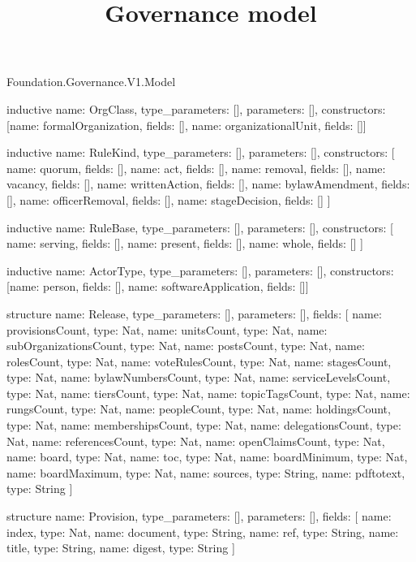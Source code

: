 \begin{lexlean}{Foundation.Governance.V1.Model}
\title{Governance model}
\begin{semanticmodule}
inductive{
  name: OrgClass,
  type_parameters: [],
  parameters: [],
  constructors: [{name: formalOrganization, fields: []}, {name: organizationalUnit, fields: []}]
}

inductive{
  name: RuleKind,
  type_parameters: [],
  parameters: [],
  constructors: [
    {name: quorum, fields: []},
    {name: act, fields: []},
    {name: removal, fields: []},
    {name: vacancy, fields: []},
    {name: writtenAction, fields: []},
    {name: bylawAmendment, fields: []},
    {name: officerRemoval, fields: []},
    {name: stageDecision, fields: []}
  ]
}

inductive{
  name: RuleBase,
  type_parameters: [],
  parameters: [],
  constructors: [
    {name: serving, fields: []},
    {name: present, fields: []},
    {name: whole, fields: []}
  ]
}

inductive{
  name: ActorType,
  type_parameters: [],
  parameters: [],
  constructors: [{name: person, fields: []}, {name: softwareApplication, fields: []}]
}

structure{
  name: Release,
  type_parameters: [],
  parameters: [],
  fields: [
    {name: provisionsCount, type: Nat},
    {name: unitsCount, type: Nat},
    {name: subOrganizationsCount, type: Nat},
    {name: postsCount, type: Nat},
    {name: rolesCount, type: Nat},
    {name: voteRulesCount, type: Nat},
    {name: stagesCount, type: Nat},
    {name: bylawNumbersCount, type: Nat},
    {name: serviceLevelsCount, type: Nat},
    {name: tiersCount, type: Nat},
    {name: topicTagsCount, type: Nat},
    {name: rungsCount, type: Nat},
    {name: peopleCount, type: Nat},
    {name: holdingsCount, type: Nat},
    {name: membershipsCount, type: Nat},
    {name: delegationsCount, type: Nat},
    {name: referencesCount, type: Nat},
    {name: openClaimsCount, type: Nat},
    {name: board, type: Nat},
    {name: toc, type: Nat},
    {name: boardMinimum, type: Nat},
    {name: boardMaximum, type: Nat},
    {name: sources, type: String},
    {name: pdftotext, type: String}
  ]
}

structure{
  name: Provision,
  type_parameters: [],
  parameters: [],
  fields: [
    {name: index, type: Nat},
    {name: document, type: String},
    {name: ref, type: String},
    {name: title, type: String},
    {name: digest, type: String}
  ]
}


\end{semanticmodule}
\end{lexlean}
